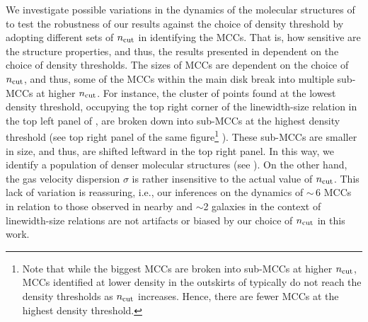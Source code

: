 \IfFileExists{emulateapjlegacy.cls}{\documentclass[iop]{emulateapjlegacy}}{\documentclass[iop]{emulateapj}}
\begin{document}
We investigate possible variations in the dynamics of the molecular structures of \flower to test the robustness of our results against the 
choice of density threshold by adopting different sets of $n_{\rm cut}$ in identifying the MCCs. That is, how sensitive are the structure properties, and thus, 
the results presented in  dependent on the choice of density thresholds.
The sizes of MCCs are dependent on the choice of $n_{\rm cut}$, 
and thus, some of the MCCs within the main disk break into multiple sub-MCCs at higher $n_{\rm cut}$. 
For instance, the cluster of points found at the lowest density threshold, 
occupying the top right corner of the linewidth-size relation in the top left panel of , 
are broken down into sub-MCCs at the highest density threshold (see top right panel of the same figure\footnote{Note
that while the biggest MCCs are broken into sub-MCCs at higher $n_{\rm cut}$, MCCs identified at lower density in the outskirts of \flower
typically do not reach the density thresholds as $n_{\rm cut}$ increases. Hence, there are fewer MCCs at the highest density threshold.} ). 
These sub-MCCs are smaller in size, and thus, are shifted leftward in the top right panel. 
In this way, we identify a population of denser molecular structures (see ). 
On the other hand, the gas velocity dispersion $\sigma$ is rather insensitive to the actual value of $n_{\rm cut}$.
This lack of variation is reassuring, i.e., our inferences on the dynamics of \z$\sim$\,6 MCCs in relation to those observed in 
nearby and \z$\sim$2 galaxies in the context of linewidth-size relations are not artifacts or biased by our choice of $n_{\rm cut}$ in this work. 

\end{document}
